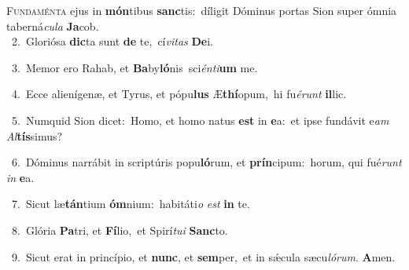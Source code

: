 \lettrine{\initial\textcolor{\initialcolor}{F}}{undaménta} ejus in \textbf{món}\-tibus \textbf{sanc}\-tis:~\star díligit Dóminus portas Sion super ómnia taberná\-\textit{cu}\-\textit{la} \textbf{Ja}\-cob.\\
{\numbfont\textcolor{\numbcolor}{~2.}}~Gloriósa \textbf{dic}\-ta sunt \textbf{de} te,~\star cí\-\textit{vi}\-\textit{tas} \textbf{De}\-i.\par
{\numbfont\textcolor{\numbcolor}{~3.}}~Memor ero Rahab, et \textbf{Ba}\-by\-\textbf{ló}\-nis~\star sci\-\textit{én}\-\textit{ti}\textbf{um} me.\par
{\numbfont\textcolor{\numbcolor}{~4.}}~Ecce alienígenæ, et Tyrus, et pópu\textbf{lus} Æ\-\textbf{thí}\-opum,~\star hi fu\-\textit{é}\-\textit{runt} \textbf{il}\-lic.\par
{\numbfont\textcolor{\numbcolor}{~5.}}~Numquid Sion dicet:~\dagger Homo, et homo natus \textbf{est} in \textbf{e}\-a:~\star et ipse fundávit e\textit{am} \textit{Al}\-\textbf{tís}simus?\par
{\numbfont\textcolor{\numbcolor}{~6.}}~Dóminus narrábit in scriptúris popu\-\textbf{ló}\-rum, et \textbf{prín}\-cipum:~\star horum, qui fué\textit{runt} \textit{in} \textbf{e}\-a.\par
{\numbfont\textcolor{\numbcolor}{~7.}}~Sicut læ\-\textbf{tán}\-tium \textbf{óm}\-nium:~\star habitáti\textit{o} \textit{est} \textbf{in} te.\par
{\numbfont\textcolor{\numbcolor}{~8.}}~Glória \textbf{Pa}\-tri, et \textbf{Fí}\-lio,~\star et Spirí\-\textit{tu}\-\textit{i} \textbf{Sanc}\-to.\par
{\numbfont\textcolor{\numbcolor}{~9.}}~Sicut erat in princípio, et \textbf{nunc}\-, et \textbf{sem}\-per,~\star et in sǽcula sæcu\-\textit{ló}\-\textit{rum}. \textbf{A}\-men.\par
